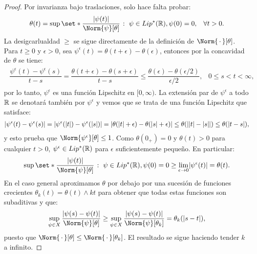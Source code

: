\documentclass[a4paper,11pt,spanish, twoside, leqno]{tfm-uam}
\begin{document}
\begin{proof}
Por invarianza bajo traslaciones, solo hace falta probar:
\begin{align*}
\begin{array}{ll}
\displaystyle
\theta(t)=\sup\set*{\dfrac{\abs{\psi(t)}}{\Norm{\psi}[\theta]}\given \psi\in Lip^{*}(\R), \psi(0)=0 },& \forall t>0.
\end{array}
\end{align*}
La desigcarlualdad $\geq$ se sigue directamente de la definición de $\Norm{\,\cdot\,}[\theta]$. Para $t\geq 0$ y $\epsilon>0$, sea $\psi^{\epsilon}(t)=\theta(t+\epsilon)-\theta(\epsilon)$, entonces por la concavidad de $\theta$ se tiene:
\begin{align*}
\begin{array}{ll}
\displaystyle
\dfrac{\psi^{\epsilon}(t)-\psi^{\epsilon}(s)}{t-s}=\dfrac{\theta(t+\epsilon)-\theta(s+\epsilon)}{t-s}\leq \dfrac{\theta(\epsilon)-\theta(\epsilon/2)}{\epsilon/2},& 0\leq s< t<\infty,
\end{array}
\end{align*}
por lo tanto, $\psi^{\epsilon}$ es una función Lipschitz en $[0,\infty)$. La extensión par de $\psi^{\epsilon}$ a todo $\mathbb{R}$ se denotará también por $\psi^{\epsilon}$ y vemos que se trata de una función Lipschitz que satisface:
\begin{align*}
\lvert\psi^{\epsilon}(t)-\psi^{\epsilon}(s)\rvert=\lvert\psi^{\epsilon}(\lvert t\rvert)-\psi^{\epsilon}(\lvert s\rvert)\rvert=\lvert\theta(\lvert t\rvert+\epsilon)-\theta(\lvert s\rvert+\epsilon)\rvert\leq \theta(\lvert\lvert t\rvert-\lvert s\rvert\rvert)\leq \theta(\lvert t-s\rvert),
\end{align*}
y esto prueba que $\Norm{\psi^{\epsilon}}[\theta]\leq 1$. Como $\theta(0_{+})=0$ y $\theta(t)>0$ para cualquier $t>0$, $\psi^{\epsilon}\in Lip^{*}(\mathbb{R})$ para $\epsilon$ suficientemente pequeño. En particular:
\begin{align*}
\sup\set*{\dfrac{\abs{\psi(t)}}{\Norm{\psi}[\theta]}\given \psi\in Lip^{*}(\R), \psi(0)=0}\geq \lim_{\epsilon\to 0}\abs{\psi^{\epsilon}(t)}=\theta(t).
\end{align*}
En el caso general aproximamos $\theta$ por debajo por una sucesión de funciones crecientes $\theta_{k}(t)=\theta(t)\wedge kt$ para obtener que todas estas funciones son subaditivas y que:
\begin{align*}
\sup_{\psi\in X}\dfrac{\abs{\psi(s)-\psi(t)}}{\Norm{\psi}[\theta]}\geq \sup_{\psi\in X}\dfrac{\abs{\psi(s)-\psi(t)}}{\Norm{\psi}[\theta_{k}]}=\theta_{k}(\abs{s-t}),
\end{align*}
puesto que $\Norm{\,\cdot\,}[\theta]\leq \Norm{\,\cdot\,}[\theta_{k}]$. El resultado se sigue haciendo tender $k$ a infinito.
\end{proof}
\end{document}
